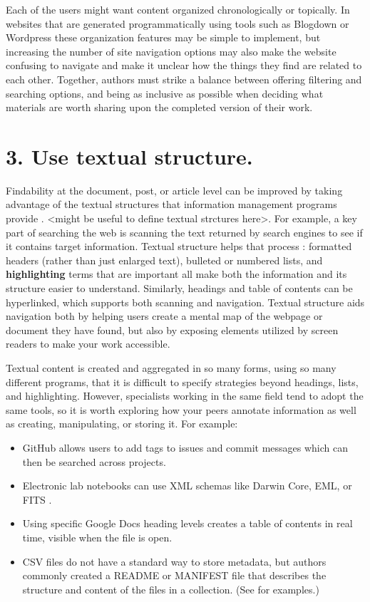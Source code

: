 \documentclass[10pt,letterpaper]{article}
\newcommand{\rulemajor}[1]{\section*{#1}}
\begin{document}
\noindent
Each of the users might want content organized chronologically or topically.
In websites that are generated programmatically using tools such as Blogdown\cite{Xie2017} 
or Wordpress \cite{Williams2015} these organization features may be simple to implement, 
but increasing the number of site navigation options may also make the website confusing 
to navigate and make it unclear how the things they find are related to each other. 
Together, authors must strike a balance between offering filtering and searching options, 
and being as inclusive as possible when deciding what materials are worth sharing upon 
the completed version of their work.

\rulemajor{3. Use textual structure.}

Findability at the document, post, or article level can be improved by taking
advantage of the textual structures that information management programs provide
\cite{Hedden2016}. <might be useful to define textual strctures here>. For example, 
a key part of searching the web is scanning the
text returned by search engines to see if it contains target information.
Textual structure helps that process \cite{Krug2014}: formatted headers (rather
than just enlarged text), bulleted or numbered lists, and \textbf{highlighting}
terms that are important all make both the information and its structure easier
to understand. Similarly, headings and table of contents can be hyperlinked,
which supports both scanning and navigation.
Textual structure aids navigation both by helping users create a mental map of the 
webpage or document they have found, but also by exposing elements utilized by 
screen readers to make your work accessible.

Textual content is created and aggregated in so many forms, using so many
different programs, that it is difficult to specify strategies beyond headings,
lists, and highlighting. However, specialists working in the same field tend to
adopt the same tools, so it is worth exploring how your peers annotate
information as well as creating, manipulating, or storing it. For example:

\begin{itemize}

\item
  GitHub allows users to add tags to issues and commit messages which can then
  be searched across projects.

\item
  Electronic lab notebooks can use XML schemas like Darwin Core, EML, or FITS
  \cite{Briney2015}.

\item
  Using specific Google Docs heading levels creates a table of contents in real
  time, visible when the file is open.

\item
  CSV files do not have a standard way to store metadata, but authors commonly
  created a README or MANIFEST file that describes the structure and content of
  the files in a collection. (See \cite{Pudding} for examples.)

\end{itemize}
\end{document}
